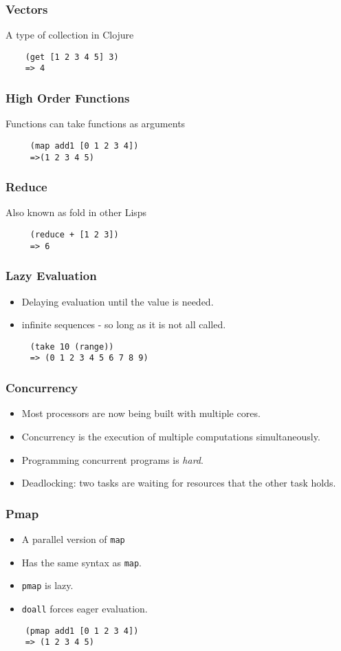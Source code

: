 \documentclass{beamer}
\newcommand{\comment}[1]{{\bf \tt  {#1}}}
\newcommand{\hfcomment}[1]{\textcolor{Teal}{\comment{Henry: {#1}}}}
\newcommand{\clocode}[1]{{\texttt {#1}}}
\begin{document}
\begin{frame}[fragile]
\frametitle{Vectors}
A type of collection in Clojure
	\begin{verbatim}
	(get [1 2 3 4 5] 3)	
	=> 4
	\end{verbatim}
\end{frame}

\begin{frame}[fragile]
\frametitle{High Order Functions}
 Functions can take functions as arguments
	\begin{verbatim}
	 (map add1 [0 1 2 3 4])
	 =>(1 2 3 4 5)
	\end{verbatim}
\end{frame}

\begin{frame}[fragile]
\frametitle{Reduce}
Also known as fold in other Lisps
	\begin{verbatim}
	 (reduce + [1 2 3])
	 => 6
	\end{verbatim}
\end{frame}

\begin{frame}[fragile]
\frametitle{Lazy Evaluation}
	\begin{itemize}
	  \item Delaying evaluation until the value is needed.
  	  \item infinite sequences - so long as it is not all called.
       \end{itemize}	
	\begin{verbatim}
	 (take 10 (range))
	 => (0 1 2 3 4 5 6 7 8 9)
	\end{verbatim}
\end{frame}

\begin{frame}
\frametitle{Concurrency}
	\begin{itemize}
	 \item Most processors are now being built with multiple cores.
	 \item Concurrency is the execution of multiple computations simultaneously.
	 \item Programming concurrent programs is \textit{hard}.
	 \item Deadlocking: two tasks are waiting for resources that the other task holds.
	\end{itemize}	
\end{frame}

\begin{frame}[fragile]
\frametitle{Pmap}
	\begin{itemize}
	 \item A parallel version of \clocode{map}
	 \item Has the same syntax as \clocode{map}.
	 \item \clocode{pmap} is lazy.
	 \item \clocode{doall} forces eager evaluation. 
	\end{itemize}	
	\begin{verbatim}
	(pmap add1 [0 1 2 3 4])
	=> (1 2 3 4 5)
	\end{verbatim}
\end{frame}
\end{document}
